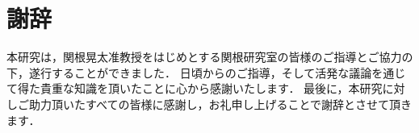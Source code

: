 \chapter*{謝辞}

本研究は，関根晃太准教授をはじめとする関根研究室の皆様のご指導とご協力の下，遂行することができました．
日頃からのご指導，そして活発な議論を通じて得た貴重な知識を頂いたことに心から感謝いたします．
最後に，本研究に対しご助力頂いたすべての皆様に感謝し，お礼申し上げることで謝辞とさせて頂きます．